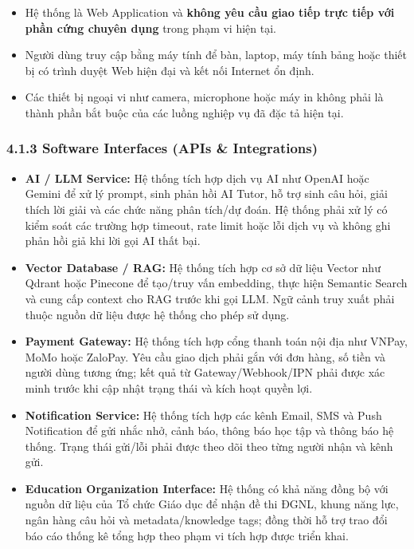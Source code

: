 \documentclass[12pt,a4paper,oneside]{report}
\begin{document}
\begin{itemize}
    \item Hệ thống là Web Application và \textbf{không yêu cầu giao tiếp trực tiếp với phần cứng chuyên dụng} trong phạm vi hiện tại.
    \item Người dùng truy cập bằng máy tính để bàn, laptop, máy tính bảng hoặc thiết bị có trình duyệt Web hiện đại và kết nối Internet ổn định.
    \item Các thiết bị ngoại vi như camera, microphone hoặc máy in không phải là thành phần bắt buộc của các luồng nghiệp vụ đã đặc tả hiện tại.
\end{itemize}

\subsubsection*{4.1.3 Software Interfaces (APIs \& Integrations)}

\begin{itemize}
    \item \textbf{AI / LLM Service:} Hệ thống tích hợp dịch vụ AI như OpenAI hoặc Gemini để xử lý prompt, sinh phản hồi AI Tutor, hỗ trợ sinh câu hỏi, giải thích lời giải và các chức năng phân tích/dự đoán. Hệ thống phải xử lý có kiểm soát các trường hợp timeout, rate limit hoặc lỗi dịch vụ và không ghi phản hồi giả khi lời gọi AI thất bại.
    \item \textbf{Vector Database / RAG:} Hệ thống tích hợp cơ sở dữ liệu Vector như Qdrant hoặc Pinecone để tạo/truy vấn embedding, thực hiện Semantic Search và cung cấp context cho RAG trước khi gọi LLM. Ngữ cảnh truy xuất phải thuộc nguồn dữ liệu được hệ thống cho phép sử dụng.
    \item \textbf{Payment Gateway:} Hệ thống tích hợp cổng thanh toán nội địa như VNPay, MoMo hoặc ZaloPay. Yêu cầu giao dịch phải gắn với đơn hàng, số tiền và người dùng tương ứng; kết quả từ Gateway/Webhook/IPN phải được xác minh trước khi cập nhật trạng thái và kích hoạt quyền lợi.
    \item \textbf{Notification Service:} Hệ thống tích hợp các kênh Email, SMS và Push Notification để gửi nhắc nhở, cảnh báo, thông báo học tập và thông báo hệ thống. Trạng thái gửi/lỗi phải được theo dõi theo từng người nhận và kênh gửi.
    \item \textbf{Education Organization Interface:} Hệ thống có khả năng đồng bộ với nguồn dữ liệu của Tổ chức Giáo dục để nhận đề thi ĐGNL, khung năng lực, ngân hàng câu hỏi và metadata/knowledge tags; đồng thời hỗ trợ trao đổi báo cáo thống kê tổng hợp theo phạm vi tích hợp được triển khai.
\end{itemize}
\end{document}
